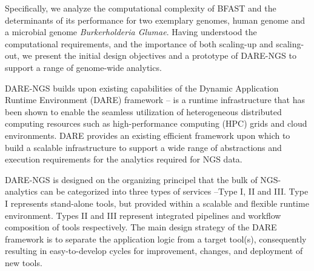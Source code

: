 \documentclass{cpeauth}
\begin{document}

Specifically, we analyze the computational complexity of
BFAST\cite{bfast2009, bfast2009b} and the determinants of its
performance for two exemplary genomes, human genome and a microbial
genome {\it Burkerholderia Glumae}\cite{kim2011}.  Having understood
the computational requirements, and the importance of both scaling-up
and scaling-out, we present the initial design objectives and a
prototype of DARE-NGS to support a range of genome-wide analytics.
 
DARE-NGS builds upon existing capabilities of the Dynamic Application
Runtime Environment (DARE) framework\cite{tg11} -- is a runtime
infrastructure that has been shown to enable the seamless utilization
of heterogeneous distributed computing
resources\cite{saga-iccs09,saga-royalsoc,saga-ccgrid10} such as
high-performance computing (HPC) grids and cloud environments.  DARE
provides an existing efficient framework upon which to build a
scalable infrastructure to support a wide range of abstractions and
execution requirements for the analytics required for NGS data.

DARE-NGS is designed on the organizing principel that the bulk of
NGS-analytics can be categorized into three types of services --Type
I, II and III. Type I represents stand-alone tools, but provided
within a scalable and flexible runtime environment. Types II and III
represent integrated pipelines and workflow composition of tools
respectively.  The main design strategy of the DARE framework is to
separate the application logic from a target tool(s), consequently
resulting in easy-to-develop cycles for improvement, changes, and
deployment of new tools.
\end{document}
